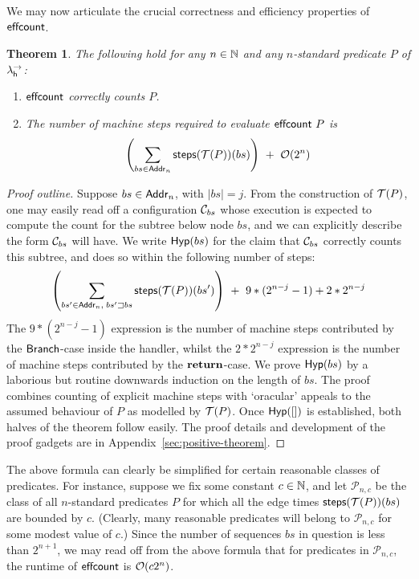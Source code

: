 \documentclass[12pt,phd,lfcs,twoside,openright,logo,leftchapter,normalheadings]{infthesis}
\theoremstyle{plain}
\newtheorem{theorem}{Theorem}[chapter]
\theoremstyle{definition}
\begin{document}
We may now articulate the crucial correctness and efficiency
properties of $\mathsf{effcount}$.

\begin{theorem}\label{thm:complexity-effectful-counting}
  The following hold for any $n \in \mathbb{N}$ and any $n$-standard predicate $P$ of $\lambda^\rightarrow_{\mathsf{h}}$:
  \begin{enumerate}
  \item $\mathsf{effcount}$ correctly counts $P$.
  \item The number of machine steps required to evaluate $\mathsf{effcount}~P$ is
{
  \[
     \left( \displaystyle\sum_{bs \in \mathsf{Addr}_n} \mathsf{steps}(\mathcal{T}(P))(bs) \right) ~+~ \mathcal{O}(2^n)
  \]}%
\end{enumerate}
\end{theorem}
%
\begin{proof}[Proof outline]
  Suppose $bs \in \mathsf{Addr}_n$, with $|bs|=j$.  From the construction of
  $\mathcal{T}(P)$, one may easily read off a configuration $\mathcal{C}_{bs}$ whose
  execution is expected to compute the count for the subtree below
  node $bs$, and we can explicitly describe the form $\mathcal{C}_{bs}$ will
  have.  We write $\mathsf{Hyp}(bs)$ for the claim that $\mathcal{C}_{bs}$
  correctly counts this subtree, and does so within the following
  number of steps: {\small
  \[
     \left( \displaystyle\sum_{bs' \in \mathsf{Addr}_n,\; bs' \sqsupset bs} \mathsf{steps}(\mathcal{T}(P))(bs') \right) ~+~ 9 * (2^{n-j} - 1) + 2*2^{n-j}
  \]
}%
%
The $9*(2^{n-j}-1)$ expression is the number of machine steps
contributed by the $\mathsf{Branch}$-case inside the handler, whilst the
$2*2^{n-j}$ expression is the number of machine steps contributed by
the $\mathbf{return}$-case.
%
We prove $\mathsf{Hyp}(bs)$ by a laborious but routine downwards
induction on the length of $bs$. The proof combines counting of
explicit machine steps with `oracular' appeals to the assumed
behaviour of $P$ as modelled by $\mathcal{T}(P)$. Once
$\mathsf{Hyp}([])$ is established, both halves of the theorem
follow easily.
%
The proof details and development of the proof gadgets are in
Appendix~\ref{sec:positive-theorem}.
\end{proof}
%

The above formula can clearly be simplified for certain reasonable
classes of predicates. For instance, suppose we fix some constant
$c \in \mathbb{N}$, and let $\mathcal{P}_{n,c}$ be the class of all
$n$-standard predicates $P$ for which all the edge times
$\mathsf{steps}(\mathcal{T}(P))(bs)$ are bounded by $c$. (Clearly, many reasonable
predicates will belong to $\mathcal{P}_{n,c}$ for some modest value of
$c$.) Since the number of sequences $bs$ in question is less than
$2^{n+1}$, we may read off from the above formula that for predicates
in $\mathcal{P}_{n,c}$, the runtime of $\mathsf{effcount}$ is $\mathcal{O}(c2^n)$.
\end{document}
